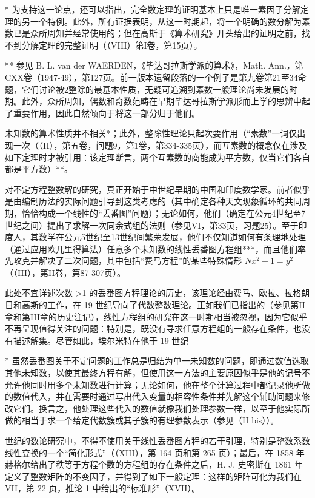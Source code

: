 * 为支持这一论点，还可以指出，完全数定理的证明基本上只是唯一素因子分解定理的另一个特例。此外，所有证据表明，从这一时期起，将一个明确的数分解为素数已是众所周知并经常使用的；但在高斯于《算术研究》开头给出的证明之前，找不到分解定理的完整证明（（VIII）第I卷，第15页）。

** 参见 B. L. van der WAERDEN，《毕达哥拉斯学派的算术》，Math. Ann.，第CXX卷（1947-49），第127页。前一版本遗留段落的一个例子是第九卷第21至34命题，它们讨论被2整除的最基本性质，无疑可追溯到素数一般理论尚未发展的时期。此外，众所周知，偶数和奇数范畴在早期毕达哥拉斯学派形而上学的思辨中起了重要作用，因此自然倾向于将这一部分归于他们。

未知数的算术性质并不相关*；此外，整除性理论只起次要作用（“素数”一词仅出现一次（（II），第五卷，问题9，第1卷，第334-335页），而互素数的概念仅在涉及如下定理时才被引用：该定理断言，两个互素数的商能成为平方数，仅当它们各自都是平方数）**。

对不定方程整数解的研究，真正开始于中世纪早期的中国和印度数学家。前者似乎是由编制历法的实际问题引导到这类考虑的（其中确定各种天文现象循环的共同周期，恰恰构成一个线性的“丢番图”问题）；无论如何，他们（确定在公元4世纪至7世纪之间）提出了求解一次同余式组的法则（参见VI，第33页，习题25）。至于印度人，其数学在公元5世纪至13世纪间繁荣发展，他们不仅知道如何有条理地处理（通过应用欧几里得算法）任意多个未知数的线性丢番图方程组***，而且他们率先攻克并解决了二次问题，其中包括“费马方程”的某些特殊情形 \(Nx^{2} + 1 = y^{2}\) （（III），第II卷，第87-307页）。

此处不宜详述次数 \textgreater1 的丢番图方程理论的历史，该理论经由费马、欧拉、拉格朗日和高斯的工作，在 19 世纪导向了代数整数理论。正如我们已指出的（参见第II章和第III章的历史注记），线性方程组的研究在这一时期相当被忽视，因为它似乎不再呈现值得关注的问题：特别是，既没有寻求任意方程组的一般存在条件，也没有描述解集。尽管如此，埃尔米特在他于 19 世纪

* 虽然丢番图关于不定问题的工作总是归结为单一未知数的问题，即通过数值选取其他未知数，以使其最终方程有解，但使用这一方法的主要原因似乎是他的记号不允许他同时用多个未知数进行计算；无论如何，他在整个计算过程中都记录他所做的数值代入，并在需要时通过写出代入变量的相容性条件并先解这个辅助问题来修改它们。换言之，他处理这些代入的数值就像我们处理参数一样，以至于他实际所做的相当于求一个给定代数簇或其子簇的有理参数表示（参见（II bis））。

世纪的数论研究中，不得不使用关于线性丢番图方程的若干引理，特别是整数系数线性变换的一个“简化形式”（（XIII），第 164 页和第 265 页）；最后，在 1858 年赫格尔给出了秩等于方程个数的方程组的存在条件之后，H. J. 史密斯在 1861 年定义了整数矩阵的不变因子，并得到了如下一般定理：这样的矩阵可化为我们在 VII，第 22 页，推论 1 中给出的“标准形”（XVII）。

